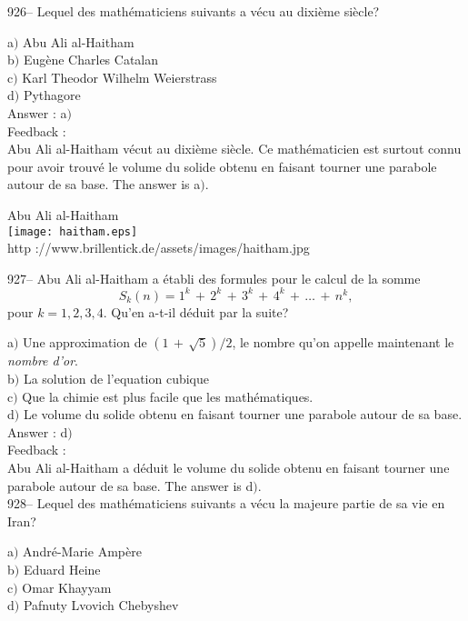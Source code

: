﻿\documentclass[letterpaper, 12pt]{article}
\begin{document}
926-- Lequel des math\'ematiciens suivants a v\'ecu au dixi\`eme
si\`ecle?

a$)$ Abu Ali al-Haitham \\
b$)$ Eug\`ene Charles Catalan \\
c$)$ Karl Theodor Wilhelm Weierstrass \\
d$)$ Pythagore\\

Answer : a$)$\\

Feedback : \\
Abu Ali al-Haitham v\'ecut au dixi\`eme si\`ecle. Ce math\'ematicien
est surtout connu pour avoir trouv\'e le volume du solide obtenu en
faisant tourner une parabole
autour de sa base. The answer is a$)$.\\

        \begin{center}
        Abu Ali al-Haitham\\
    \texttt{[image: haitham.eps]}\\
        {\footnotesize http ://www.brillentick.de/assets/images/haitham.jpg}
    \end{center}

927-- Abu Ali al-Haitham a \'etabli des formules pour le calcul de la somme
$$S_k(n) =1^k\,+\,2^k\,+\,3^k\,+\,4^k\,+\,\ldots\,+\,n^k,$$
pour $k=1,2,3,4$. Qu'en a-t-il d\'eduit par la suite?

a$)$ Une approximation de $(1\,+\,\sqrt5)/2$, le nombre qu'on appelle
maintenant le {\sl nombre d'or}. \\
b$)$ La solution de l'equation cubique \\
c$)$ Que la chimie est plus facile que les math\'ematiques. \\
d$)$ Le volume du solide obtenu en faisant tourner une parabole autour de sa
base.\\

Answer : d$)$\\

Feedback : \\
Abu Ali al-Haitham a d\'eduit le volume du solide obtenu en faisant tourner
une parabole autour de sa base. The answer is d$)$.\\

928-- Lequel des math\'ematiciens suivants a v\'ecu la majeure
partie de sa vie en Iran?

a$)$ Andr\'e-Marie Amp\`ere \\
b$)$ Eduard Heine \\
c$)$ Omar Khayyam \\
d$)$ Pafnuty Lvovich Chebyshev\\
\end{document}
